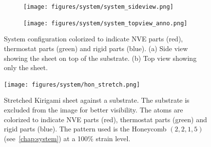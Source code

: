 \begin{figure}[H]
  \centering
  \begin{subfigure}[b]{0.8\textwidth}
      \centering
      \texttt{[image: figures/system/system\_sideview.png]}
      \caption{}
      \label{fig:sideview}
  \end{subfigure}
  \begin{subfigure}[b]{0.8\textwidth}
      \centering
      \texttt{[image: figures/system/system\_topview\_anno.png]}
      \caption{}
      \label{fig:topview}
  \end{subfigure}
     \caption{System configuration colorized to indicate NVE parts (red), thermostat parts (green) and rigid parts (blue). (a) Side view showing the sheet on top of the substrate. (b) Top view showing only the sheet.}
     \label{fig:system}
\end{figure}


\begin{figure}[H]
  \centering
  \texttt{[image: figures/system/hon\_stretch.png]}
  \caption{Stretched Kirigami sheet against a substrate. The substrate is excluded from the image for better visibility. The atoms are colorized to indicate NVE parts (red), thermostat parts (green) and rigid parts (blue). The pattern used is the Honeycomb $(2,2,1,5)$ (see~\cref{chap:system}) at a 100\% strain level.}
  \label{fig:kirigami_stretch}
\end{figure}



